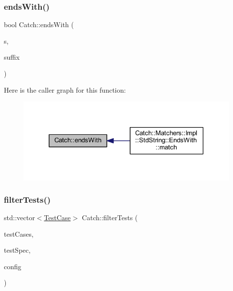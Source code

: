 \hypertarget{namespace_catch_ada025504f627feaf9ac68ca391515dff}{}\label{namespace_catch_ada025504f627feaf9ac68ca391515dff} 
\subsubsection{\texorpdfstring{ends\+With()}{endsWith()}}
{\footnotesize\ttfamily bool Catch\+::ends\+With (\begin{DoxyParamCaption}\item[{std\+::string const \&}]{s,  }\item[{std\+::string const \&}]{suffix }\end{DoxyParamCaption})}

Here is the caller graph for this function\+:\nopagebreak
\begin{figure}[H]
\begin{center}
\leavevmode
\includegraphics[width=318pt]{namespace_catch_ada025504f627feaf9ac68ca391515dff_icgraph}
\end{center}
\end{figure}
\hypertarget{namespace_catch_ab5da9aa67c42a3f626aea07d0b556829}{}\label{namespace_catch_ab5da9aa67c42a3f626aea07d0b556829} 
\subsubsection{\texorpdfstring{filter\+Tests()}{filterTests()}}
{\footnotesize\ttfamily std\+::vector$<$\hyperlink{class_catch_1_1_test_case}{Test\+Case}$>$ Catch\+::filter\+Tests (\begin{DoxyParamCaption}\item[{std\+::vector$<$ \hyperlink{class_catch_1_1_test_case}{Test\+Case} $>$ const \&}]{test\+Cases,  }\item[{Test\+Spec const \&}]{test\+Spec,  }\item[{I\+Config const \&}]{config }\end{DoxyParamCaption})}

